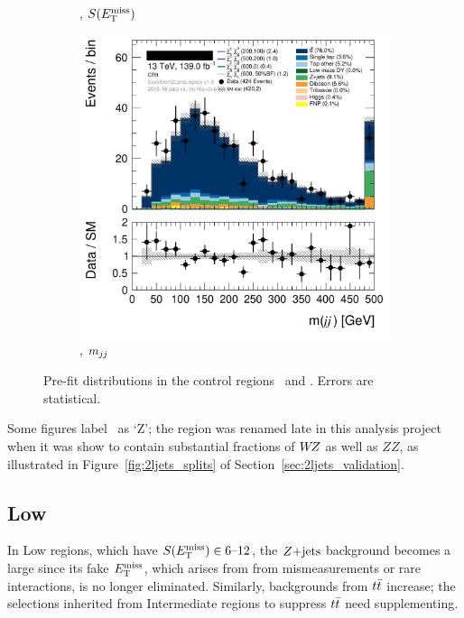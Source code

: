 \begin{figure}[tp]
\begin{subfigure}{0.48\textwidth}
\caption{\crtt, $S(E_\mathrm{T}^\mathrm{miss})$}
\end{subfigure}
\hfill
\begin{subfigure}{0.48\textwidth}
\centering
\includegraphics[width=\textwidth]{figures/2ljets_def_mjj_CRtt.png}
\caption{\crtt, $m_{jj}$}
\end{subfigure}
\caption[
Pre-fit distributions in the control regions CR-tt and CR-VZ
]{%
Pre-fit distributions in the control regions \crtt\ and \crvz.
Errors are statistical.
}
\label{fig:2ljets_int_cr_region}
\end{figure}

Some figures label \crvz\ as `\crz Z'; the region was renamed late in this
analysis project when it was show to contain substantial fractions of $W\kern-0.4exZ$
as well as $ZZ$, as illustrated in Figure~\ref{fig:2ljets_splits} of
Section~\ref{sec:2ljets_validation}.


\FloatBarrier
\subsection{Low}
\label{sec:2ljets_low}
In Low regions, which have $S(E_\mathrm{T}^\mathrm{miss}) \in 6\textrm{--}12$, the $Z\mathrm{+jets}$
background becomes a large since its fake $E_\mathrm{T}^\mathrm{miss}$, which arises from
from mismeasurements or rare interactions, is no longer eliminated.
Similarly, backgrounds from $t\bar t$ increase; the selections inherited from
Intermediate regions to suppress $t\bar t$ need supplementing.

